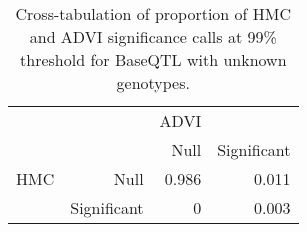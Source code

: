 \begin{table}[ht]
\centering
\begin{tabular}{rr|rr}
   &  & ADVI &  \\ 
    &   & Null & Significant \\ 
   \hline
HMC & Null & 0.986 & 0.011 \\ 
    & Significant & 0 & 0.003 \\ 
  \end{tabular}
\caption{Cross-tabulation of proportion of HMC and ADVI significance calls at 99\% threshold for BaseQTL with unknown genotypes.} 
\label{tab:nogt-xtab-prop-99}
\end{table}
